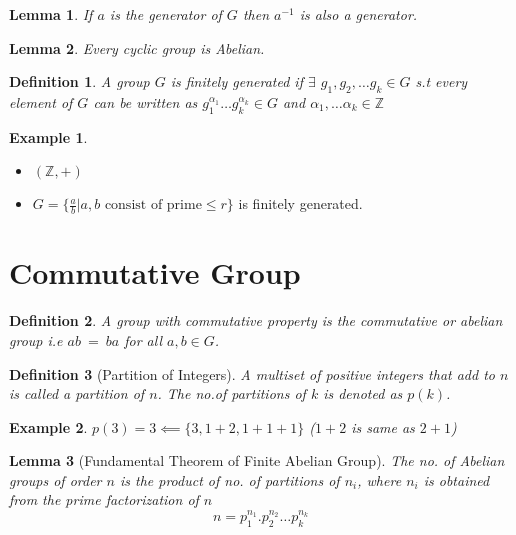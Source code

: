 \documentclass[12pt,a4paper]{article}
\newcommand{\Z}{\mathbb{Z}}
\newtheorem*{defn}{Definition}
\newtheorem*{lem}{Lemma}
\newtheorem{ex}{Example}
\begin{document}
\begin{lem}\normalfont
	If $a$ is the generator of $G$ then $a^{-1}$ is also a generator.
\end{lem}
\begin{lem}\normalfont
	Every cyclic group is Abelian.
\end{lem}
\begin{defn}\normalfont
	A group $G$ is finitely generated if $\exists$ $g_{1},g_{2},\dots g_{k}\in G$ s.t every element of $G$ can be written as $g_{1}^{{\alpha}_{1}} \dots g_{k}^{{\alpha}_{k}} \in G  $ and $\alpha_{1}, \dots \alpha_{k} \in \Z$
\end{defn}
\begin{ex}
\end{ex}	
\begin{itemize}
	\item $(\Z, +)$
	\item $G = \{\frac{a}{b} | a,b \text{ consist of prime} \le r\}$ is finitely generated.
\end{itemize}






\section{Commutative Group}

\begin{defn}\normalfont
	A group with commutative property is the \textit{commutative or abelian} group i.e $ab\:=\:ba$ for all $a,b\in G$.
\end{defn}
\begin{defn}[Partition of Integers]\normalfont
	A multiset of positive integers that add to $n$ is called a partition of $n$. The no.of partitions of $k$ is denoted as $p(k)$.
\end{defn}
\begin{ex}
	$p(3) = 3 \impliedby \{3,1+2,1+1+1\}$ ($1+2$ is same as $2+1$)
\end{ex}
\begin{lem}[Fundamental Theorem of Finite Abelian Group]\normalfont
	The no. of Abelian groups of order $n$ is the product of no. of partitions of $n_{i}$, where $n_{i}$ is obtained from the prime factorization of $n$ 
	$$
		n = p_{1}^{{n}_{1}}. p_{2}^{{n}_{2}}\dots p_{k}^{{n}_{k}}
	$$
\end{lem}
\end{document}
